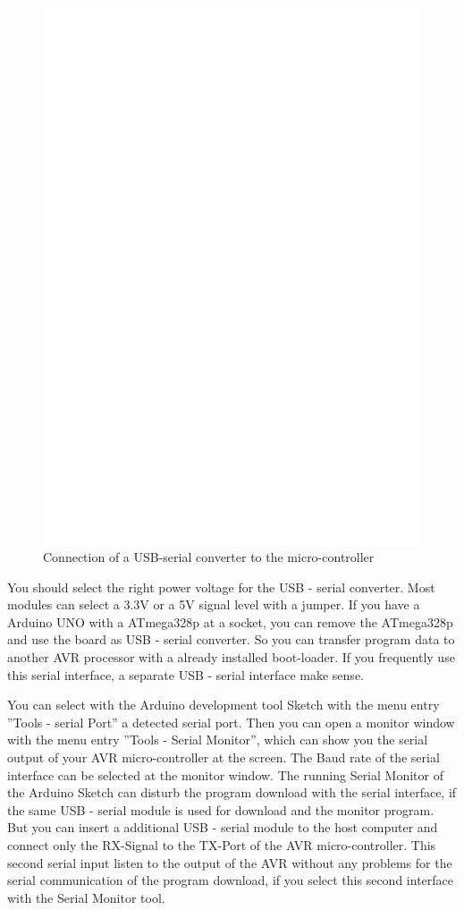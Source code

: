 \begin{figure}[H]
\centering
\includegraphics[width=12cm]{../FIG/UM232.eps}
\caption{Connection of a USB-serial converter to the micro-controller}
\label{fig:UM232}
\end{figure}

You should select the right power voltage for the USB - serial converter.
Most modules can select a 3.3V or a 5V signal level with a jumper.
If you have a Arduino UNO with a ATmega328p at a socket, you can remove the
ATmega328p and use the board as USB - serial converter.
So you can transfer program data to another AVR processor with a already
installed boot-loader. If you frequently use this serial interface,
a separate USB - serial interface make sense.

You can select with the Arduino development tool Sketch with the menu entry ''Tools - serial Port''
a detected serial port. Then you can open a monitor window with the menu entry ''Tools - Serial Monitor'',
which can show you the serial output of your AVR micro-controller at the screen.
The Baud rate of the serial interface can be selected at the monitor window.
The running Serial Monitor of the Arduino Sketch can disturb the program download with the
serial interface, if the same USB - serial module is used for download and the monitor program.
But you can insert a additional USB - serial module to the host computer and connect
only the RX-Signal to the TX-Port of the AVR micro-controller.
This second serial input listen to the output of the AVR without any problems
for the serial communication of the program download, if you select
this second interface with the Serial Monitor tool.


